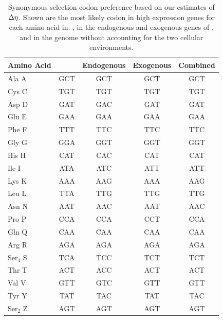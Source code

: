 \documentclass[fleqn,letterpaper]{article}
\begin{document}
\begin{table}
    \centering
    \caption{Synonymous selection codon preference based on our estimates of ${\Delta \eta}$.
	 Shown are the most likely codon in high expression genes for each amino acid in: \gossypii, in the endogenous and exogenous genes of \kluyveri, and in the \kluyveri genome without accounting for the two cellular environments.}
\begin{tabular}{  l  c  c  c  c  }
\hline
	Amino Acid & \gossypii & Endogenous & Exogenous & Combined \\ \hline
	Ala A & GCT & GCT & GCT & GCT \\ 
	Cys C & TGT & TGT & TGT & TGT \\ 
	Asp D & GAT & GAC & GAT & GAT \\ 
	Glu E & GAA & GAA & GAA & GAA \\ 
	Phe F & TTT & TTC & TTC & TTC \\ 
	Gly G & GGA & GGT & GGT & GGT \\ 
	His H & CAT & CAC & CAT & CAT \\ 
	Ile I & ATA & ATC & ATT & ATT \\ 
	Lys K & AAA & AAG & AAA & AAG \\ 
	Leu L & TTA & TTG & TTG & TTG \\ 
	Asn N & AAT & AAC & AAT & AAC \\ 
	Pro P & CCA & CCA & CCT & CCA \\ 
	Gln Q & CAA & CAA & CAA & CAA \\ 
	Arg R & AGA & AGA & AGA & AGA \\ 
	Ser$_4$ S & TCA & TCC & TCT & TCT \\ 
	Thr T & ACT & ACC & ACT & ACT \\ 
	Val V & GTT & GTC & GTT & GTT \\ 
	Tyr Y & TAT & TAC & TAT & TAC \\ 
	Ser$_2$ Z & AGT & AGT & AGT & AGT \\ \hline
\end{tabular}
    \label{tab:codon_pref_deta}
\end{table}
\clearpage
\end{document}
